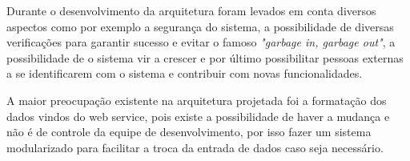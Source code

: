Durante o desenvolvimento da arquitetura foram levados em conta diversos aspectos como por exemplo a segurança do sistema, a possibilidade de diversas verificações para garantir sucesso e evitar o famoso \textit{"garbage in, garbage out"}, a possibilidade de o sistema vir a crescer e por último possibilitar pessoas externas a se identificarem com o sistema e contribuir com novas funcionalidades.

A maior preocupação existente na arquitetura projetada foi a formatação dos dados vindos do web service, pois existe a possibilidade de haver a mudança e não é de controle da equipe de desenvolvimento, por isso fazer um sistema modularizado para facilitar a troca da entrada de dados caso seja necessário.